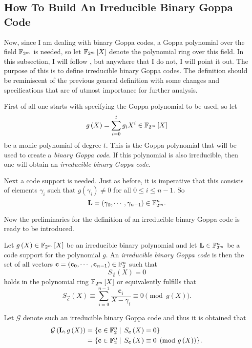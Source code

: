 \subsection{How To Build An Irreducible Binary Goppa Code}
\label{subsec:howToIrrBinGoppa}

Now, since I am dealing with binary Goppa codes, a Goppa polynomial over the field $\mathbb{F}_{2^m}$ is needed, so let $\mathbb{F}_{2^m}\left[X\right]$ denote the polynomial ring over this field. In this subsection, I will follow \cite{EOS}, but anywhere that I do not, I will point it out. The purpose of this is to define irreducible binary Goppa codes. The definition should be reminiscent of the previous general definition with some changes and specifications that are of utmost importance for further analysis.

First of all one starts with specifying the Goppa polynomial to be used, so let
\[
	g\left(X\right) = \sum\limits_{i=0}^{t} g_i X^i \in \mathbb{F}_{2^m}\left[X\right]
\]
be a monic polynomial of degree $t$. This is the Goppa polynomial that will be used to create a \emph{binary Goppa code}. If this polynomial is also irreducible, then one will obtain an \emph{irreducible binary Goppa code}.

Next a code support is needed. Just as before, it is imperative that this consists of elements $\gamma_i$ such that $g\left(\gamma_i\right) \neq 0$ for all $0 \leq i \leq n-1$. So
\[
	\mathbf{L} = \left(\gamma_0, \cdots , \gamma_{n-1}\right) \in \mathbb{F}_{2^m}^n.
\]

Now the preliminaries for the definition of an irreducible binary Goppa code is ready to be introduced.
\begin{defi}
\label{def:IrrBinGoppaCode}
	Let $g\left(X\right) \in \mathbb{F}_{2^m}\left[X\right]$ be an irreducible binary polynomial and let $\mathbf{L} \in \mathbb{F}_{2^m}^n$ be a code support for the polynomial $g$. An \emph{irreducible binary Goppa code} is then the set of all vectors $\boldsymbol{\mathrm{c}} = \left(\mathbf{c}_0, \cdots , \mathbf{c}_{n-1}\right) \in \mathbb{F}_{2}^n$ such that
	\[
		S_{\vec{c}}\left(X\right) = 0
	\]
	holds in the polynomial ring $\mathbb{F}_{2^m}\left[X\right]$ or equivalently fulfills that
	\begin{equation*}
		S_{\vec{c}}\left(X\right) \equiv \sum\limits_{i=0}^{n-1} \frac{\mathbf{c}_i}{X - \gamma_i} \equiv 0 \pmod {g\left(X\right)}.
	\end{equation*}
\end{defi}

Let $\mathcal{G}$ denote such an irreducible binary Goppa code and thus it is obtained that
\begin{align*}
\mathcal{G}\left(\mathbf{L}, g\left(X\right)\right) &= \left\{ \vec{c} \in \F_{2}^n \ \middle\vert \ S_{\vec{c}}\left(X\right) = 0 \right\}\\
	&= \left\{ \vec{c} \in \F_{2}^n \ \middle\vert \ S_{\vec{c}}\left(X\right) \equiv 0 \pmod {g\left(X\right)} \right\}.
\end{align*}

